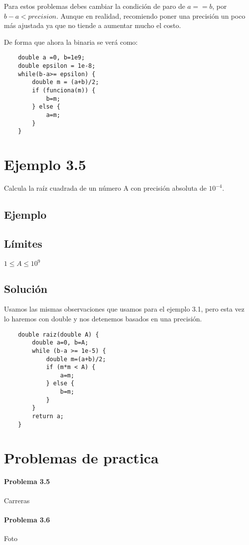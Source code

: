 Para estos problemas debes cambiar la condición de paro de \(a==b\), por \(b-a < precision\). Aunque en realidad, recomiendo poner una precisión un poco más ajustada ya que no tiende a aumentar mucho el costo.

De forma que ahora la binaria se verá como:

\begin{lstlisting}
	double a =0, b=1e9;
	double epsilon = 1e-8;
	while(b-a>= epsilon) {
		double m = (a+b)/2;
		if (funciona(m)) {
			b=m;
		} else {
			a=m;
		}
	}
\end{lstlisting}

\section*{Ejemplo 3.5}
Calcula la raíz cuadrada de un número A con precisión absoluta de \(10^{-4}\).
\subsection*{Ejemplo}
\begin{casebox2}
\end{casebox2}
\subsection*{Límites}
\begin{plimits}
	\item \(1\leq A \leq 10^9\)
\end{plimits}
\subsection*{Solución}
Usamos las mismas observaciones que usamos para el ejemplo 3.1, pero esta vez lo haremos con double y nos detenemos basados en una precisión.
\begin{lstlisting}
	double raiz(double A) {
		double a=0, b=A;
		while (b-a >= 1e-5) {
			double m=(a+b)/2;
			if (m*m < A) {
				a=m;
			} else {
				b=m;
			}
		}
		return a;
	}
\end{lstlisting}

\newpage
\section*{Problemas de practica}
\paragraph{Problema 3.5} Carreras

\problembreak

\paragraph{Problema 3.6} Foto

